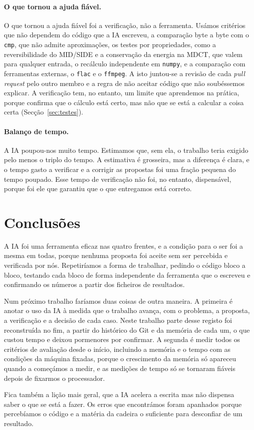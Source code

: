 \documentclass[a4paper,11pt]{article}
\newcommand{\prog}[1]{\texttt{#1}}
\begin{document}
\paragraph{O que tornou a ajuda fiável.}
O que tornou a ajuda fiável foi a verificação, não a ferramenta. Usámos
critérios que não dependem do código que a IA escreveu, a comparação byte a byte
com o \prog{cmp}, que não admite aproximações, os testes por propriedades, como
a reversibilidade do MID/SIDE e a conservação da energia na MDCT, que valem para
qualquer entrada, o recálculo independente em \prog{numpy}, e a comparação com
ferramentas externas, o \prog{flac} e o \prog{ffmpeg}. A isto juntou-se a
revisão de cada \emph{pull request} pelo outro membro e a regra de não aceitar
código que não soubéssemos explicar. A verificação tem, no entanto, um limite
que aprendemos na prática, porque confirma que o cálculo está certo, mas não que
se está a calcular a coisa certa (Secção~\ref{sec:testes}).

\paragraph{Balanço de tempo.}
A IA poupou-nos muito tempo. Estimamos que, sem ela, o trabalho teria exigido
pelo menos o triplo do tempo. A estimativa é grosseira, mas a diferença é
clara, e o tempo gasto a verificar e a corrigir as propostas foi uma fração
pequena do tempo poupado. Esse tempo de verificação não foi, no entanto,
dispensável, porque foi ele que garantiu que o que entregamos está correto.

\section{Conclusões}
\label{sec:conclusoes}
A IA foi uma ferramenta eficaz nas quatro frentes, e a condição para o ser foi
a mesma em todas, porque nenhuma proposta foi aceite sem ser percebida e
verificada por nós. Repetiríamos a forma de trabalhar, pedindo o código bloco a
bloco, testando cada bloco de forma independente da ferramenta que o escreveu e
confirmando os números a partir dos ficheiros de resultados.

Num próximo trabalho faríamos duas coisas de outra maneira. A primeira é anotar
o uso da IA à medida que o trabalho avança, com o problema, a proposta, a
verificação e a decisão de cada caso. Neste trabalho parte desse registo foi
reconstruída no fim, a partir do histórico do Git e da memória de cada um, o que
custou tempo e deixou pormenores por confirmar. A segunda é medir todos os
critérios de avaliação desde o início, incluindo a memória e o tempo com as
condições da máquina fixadas, porque o crescimento da memória só apareceu
quando a começámos a medir, e as medições de tempo só se tornaram fiáveis
depois de fixarmos o processador.

Fica também a lição mais geral, que a IA acelera a escrita mas não dispensa
saber o que se está a fazer. Os erros que encontrámos foram apanhados porque
percebíamos o código e a matéria da cadeira o suficiente para desconfiar de um
resultado.
\end{document}
